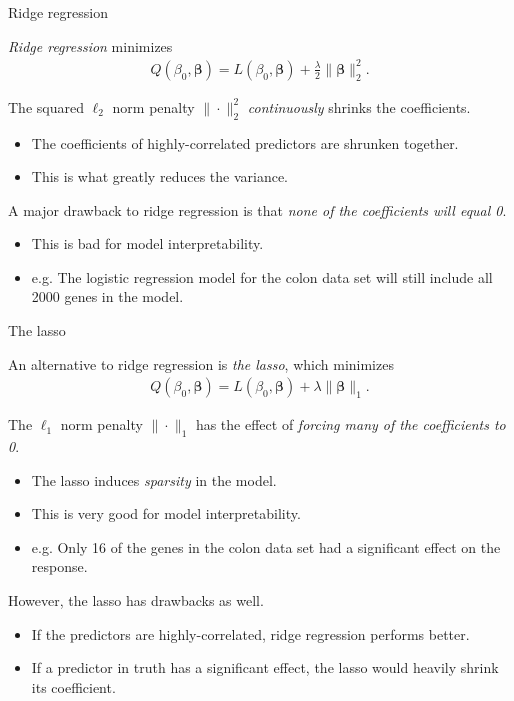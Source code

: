 \documentclass[8pt]{beamer}
\newcommand{\mys}{\vspace{0.5cm} \pause
}
\newcommand{\mysa}{\vspace{0.2cm} \pause
}
\begin{document}

\begin{frame}{\color{white} Ridge regression}

\textit{Ridge regression} minimizes 
\begin{align}
    \label{ridge regression}
    Q(\beta_0, \bm{\beta}) = L(\beta_0, \bm{\beta}) + \frac{\lambda}{2} \| \bm{\beta} \|_2^2.
\end{align} \mysa

The squared $\ell_2$ norm penalty $\| \cdot \|_2^2$ \textit{continuously} shrinks the coefficients.
\begin{itemize}
    \item The coefficients of highly-correlated predictors are shrunken together.
    \item This is what greatly reduces the variance.
\end{itemize} \mys

A major drawback to ridge regression is that \textit{none of the coefficients will equal 0}.
\begin{itemize}
    \item This is bad for model interpretability.
    \item e.g. The logistic regression model for the colon data set will still include all 2000 genes in the model.
\end{itemize}
    
\end{frame}

\begin{frame}{\color{white} The lasso}

An alternative to ridge regression is \textit{the lasso}, which minimizes 
\begin{align}
    \label{lasso}
    Q(\beta_0, \bm{\beta}) = L(\beta_0, \bm{\beta}) + \lambda \| \bm{\beta} \|_1.
\end{align} \mysa

The $\ell_1$ norm penalty $\| \cdot \|_1$ has the effect of \textit{forcing many of the coefficients to 0}.
\begin{itemize}
    \item The lasso induces \textit{sparsity} in the model. %
    \item This is very good for model interpretability.
    \item e.g. Only 16 of the genes in the colon data set had a significant effect on the response.
\end{itemize} \mys

However, the lasso has drawbacks as well.
\begin{itemize}
    \item If the predictors are highly-correlated, ridge regression performs better.
    \item If a predictor in truth has a significant effect, the lasso would heavily shrink its coefficient.
\end{itemize}
    
\end{frame}
\end{document}

